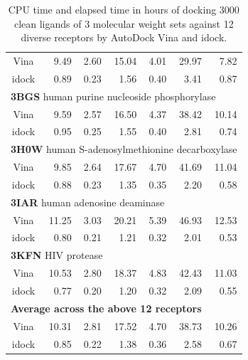 \documentclass[12pt]{article}
\begin{document}
\begin{table}
\begin{tabular}{crrrrrr}
Vina  &  9.49 &  2.60 & 15.04 &  4.01 & 29.97 &  7.82\\
idock &  0.89 &  0.23 &  1.56 &  0.40 &  3.41 &  0.87\\
\multicolumn{7}{l}{\textbf{3BGS} human purine nucleoside phosphorylase}\\
Vina  &  9.59 &  2.57 & 16.50 &  4.37 & 38.42 & 10.14\\
idock &  0.95 &  0.25 &  1.55 &  0.40 &  2.81 &  0.74\\
\multicolumn{7}{l}{\textbf{3H0W} human S-adenosylmethionine decarboxylase}\\
Vina  &  9.85 &  2.64 & 17.67 &  4.70 & 41.69 & 11.04\\
idock &  0.88 &  0.23 &  1.35 &  0.35 &  2.20 &  0.58\\
\multicolumn{7}{l}{\textbf{3IAR} human adenosine deaminase}\\
Vina  & 11.25 &  3.03 & 20.21 &  5.39 & 46.93 & 12.53\\
idock &  0.80 &  0.21 &  1.21 &  0.32 &  2.01 &  0.53\\
\multicolumn{7}{l}{\textbf{3KFN} HIV protease}\\
Vina  & 10.53 &  2.80 & 18.37 &  4.83 & 42.43 & 11.03\\
idock &  0.77 &  0.20 &  1.20 &  0.32 &  2.09 &  0.55\\
\multicolumn{7}{l}{\textbf{Average across the above 12 receptors}}\\
Vina  & 10.31 &  2.81 & 17.52 &  4.70 & 38.73 & 10.26\\
idock &  0.85 &  0.22 &  1.38 &  0.36 &  2.58 &  0.67\\
\hline
\end{tabular}
\caption{\label{ExecutionTime} CPU time and elapsed time in hours of docking 3000 clean ligands of 3 molecular weight sets against 12 diverse receptors by AutoDock Vina and idock.}
\end{table}
\end{document}
